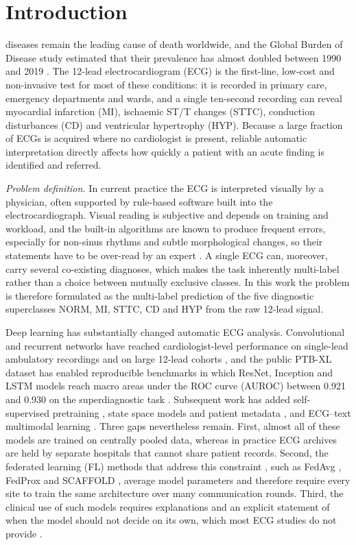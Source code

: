 \section{Introduction}
\label{sec:intro}

 diseases remain the leading cause of death worldwide, and the
Global Burden of Disease study estimated that their prevalence has almost doubled between 1990
and 2019 \cite{roth2020gbd}. The 12-lead electrocardiogram (ECG) is the first-line, low-cost and
non-invasive test for most of these conditions: it is recorded in primary care, emergency
departments and wards, and a single ten-second recording can reveal myocardial infarction (MI),
ischaemic ST/T changes (STTC), conduction disturbances (CD) and ventricular hypertrophy (HYP).
Because a large fraction of ECGs is acquired where no cardiologist is present, reliable automatic
interpretation directly affects how quickly a patient with an acute finding is identified and
referred.

\textit{Problem definition.} In current practice the ECG is interpreted visually by a physician,
often supported by rule-based software built into the electrocardiograph. Visual reading is
subjective and depends on training and workload, and the built-in algorithms are known to produce
frequent errors, especially for non-sinus rhythms and subtle morphological changes, so their
statements have to be over-read by an expert \cite{schlapfer2017}. A single ECG can, moreover,
carry several co-existing diagnoses, which makes the task inherently multi-label rather than a
choice between mutually exclusive classes. In this work the problem is therefore formulated as
the multi-label prediction of the five diagnostic superclasses NORM, MI, STTC, CD and HYP from the
raw 12-lead signal.

Deep learning has substantially changed automatic ECG analysis. Convolutional and recurrent
networks have reached cardiologist-level performance on single-lead ambulatory recordings
\cite{hannun2019} and on large 12-lead cohorts \cite{ribeiro2020}, and the public PTB-XL dataset
\cite{wagner2020ptbxl} has enabled reproducible benchmarks in which ResNet, Inception and LSTM
models reach macro areas under the ROC curve (AUROC) between 0.921 and 0.930 on the
superdiagnostic task \cite{strodthoff2021}. Subsequent work has added self-supervised pretraining
\cite{mehari2022ssl,na2024stmem}, state space models and patient metadata \cite{mehari2023s4}, and
ECG--text multimodal learning \cite{li2023mets,liu2024merl}. Three gaps nevertheless remain.
First, almost all of these models are trained on centrally pooled data, whereas in practice ECG
archives are held by separate hospitals that cannot share patient records. Second, the federated
learning (FL) methods that address this constraint \cite{rieke2020future,kairouz2021advances}, such as FedAvg \cite{mcmahan2017fedavg},
FedProx \cite{li2020fedprox} and SCAFFOLD \cite{karimireddy2020scaffold}, average model parameters
and therefore require every site to train the same architecture over many communication rounds.
Third, the clinical use of such models requires explanations and an explicit statement of when the
model should not decide on its own, which most ECG studies do not provide \cite{wagner2024xai}.

